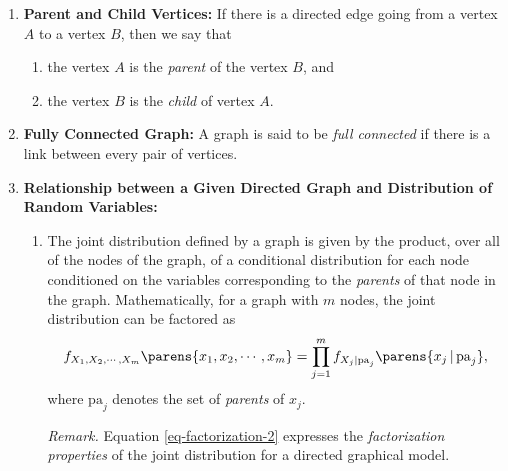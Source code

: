 \documentclass[12pt]{article}
\begin{document}
\begin{enumerate}[label=\textbf{\arabic*.}]
	\item \textbf{Parent and Child Vertices:} If there is a directed edge going from a vertex $A$ to a vertex $B$, then we say that 
	\begin{enumerate}
		\item the vertex $A$ is the \emph{parent} of the vertex $B$, and 
		\item the vertex $B$ is the \emph{child} of vertex $A$. 
	\end{enumerate}
	
	
	\item \textbf{Fully Connected Graph:} A graph is said to be \emph{full connected} if there is a link between every pair of vertices. 
	
	\item \textbf{Relationship between a Given Directed Graph and Distribution of Random Variables:} 
	\begin{enumerate}
		\item The joint distribution defined by a graph is given by the product, over all of the nodes of the graph, of a conditional distribution for each node conditioned on the variables corresponding to the \emph{parents} of that node in the graph. Mathematically, for a graph with $m$ nodes, the joint distribution can be factored as 
		\begin{align}\label{eq-factorization-2}
			f_{X_1, X_2, \cdots, X_m} \parens{x_1, x_2, \cdots, x_m} = \prod_{j=1}^m f_{X_j \vert \mathrm{pa}_j} \parens{x_j \,\vert\, \mathrm{pa}_j}, 
		\end{align}
		where $\mathrm{pa}_j$ denotes the set of \emph{parents} of $x_j$. 
		
		\textit{Remark.} Equation \eqref{eq-factorization-2} expresses the \emph{factorization properties} of the joint distribution for a directed graphical model. 
		

\end{enumerate}
\end{enumerate}
\end{document}
